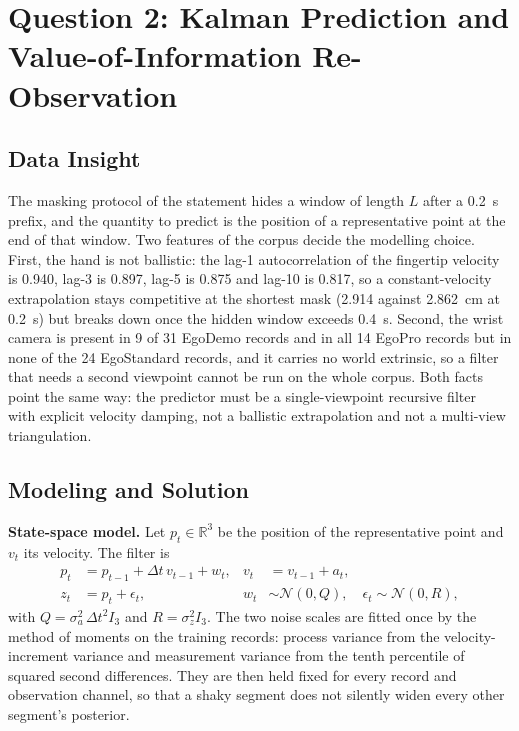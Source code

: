 \documentclass{swmcmthesis}
\begin{document}
\section{Question 2: Kalman Prediction and Value-of-Information Re-Observation}\label{sec:q2}
\subsection{Data Insight}
The masking protocol of the statement hides a window of length $L$ after a 0.2~s prefix, and the quantity to predict is the position of a representative point at the end of that window. Two features of the corpus decide the modelling choice. First, the hand is not ballistic: the lag-1 autocorrelation of the fingertip velocity is 0.940, lag-3 is 0.897, lag-5 is 0.875 and lag-10 is 0.817, so a constant-velocity extrapolation stays competitive at the shortest mask (2.914 against 2.862~cm at 0.2~s) but breaks down once the hidden window exceeds 0.4~s. Second, the wrist camera is present in 9 of 31 EgoDemo records and in all 14 EgoPro records but in none of the 24 EgoStandard records, and it carries no world extrinsic, so a filter that needs a second viewpoint cannot be run on the whole corpus. Both facts point the same way: the predictor must be a single-viewpoint recursive filter~\cite{ref3} with explicit velocity damping, not a ballistic extrapolation and not a multi-view triangulation.
\subsection{Modeling and Solution}
\textbf{State-space model.} Let $p_t\in\mathbb{R}^3$ be the position of the representative point and $v_t$ its velocity. The filter is
\begin{equation}
\begin{aligned}
p_t &= p_{t-1}+\Delta t\,v_{t-1}+w_t, &
v_t &= v_{t-1}+a_t,\\
z_t &= p_t+\epsilon_t, & w_t&\sim\mathcal N(0,Q),\quad \epsilon_t\sim\mathcal N(0,R),
\end{aligned}
\end{equation}
with $Q=\sigma_a^2\,\Delta t^2 I_3$ and $R=\sigma_z^2 I_3$. The two noise scales are fitted once by the method of moments on the training records: process variance from the velocity-increment variance and measurement variance from the tenth percentile of squared second differences. They are then held fixed for every record and observation channel, so that a shaky segment does not silently widen every other segment's posterior.
\end{document}

